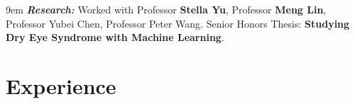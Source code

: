 \documentclass{clean_cv}
\begin{document}
\begin{datetabular}{9em}
{\textit{\textbf{Research:}} Worked with Professor \textbf{Stella Yu}, Professor \textbf{Meng Lin}, Professor Yubei Chen, Professor Peter Wang. Senior Honors Thesis: \textbf{Studying Dry Eye Syndrome with Machine Learning}.
}



\end{datetabular}

\section{Experience}
\end{document}
